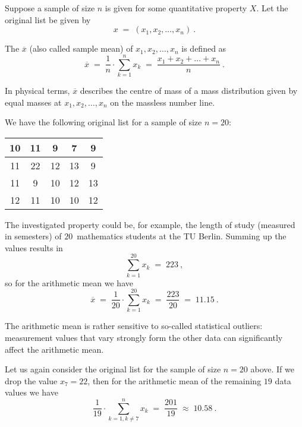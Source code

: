 
\begin{MIntro}

Suppose a sample of size $n$ is given for some quantitative property $X$. Let the original list be given by
$$
x\; =\; (x_{1},x_{2},\ldots ,x_{n})\: .
$$

\begin{MInfo}
The  $\overline{x}$ (also called sample mean) of $x_{1},x_{2},\ldots ,x_{n}$ is defined as
$$
\overline{x}\; =\; \frac{1}{n}\cdot \sum\limits_{k=1} ^{n} x_{k}\;=\;\frac{x_{1}+x_{2}+\ldots +x_{n}}{n}\: .
$$
\end{MInfo}

In physical terms, $\overline{x}$ describes the centre of mass of a mass distribution given by equal masses 
at $x_{1},x_{2},\ldots ,x_{n}$ on the massless number line.


\begin{MExample}
We have the following original list for a sample of size $n=20$:
\begin{center}
\begin{tabular}{|c|c|c|c|c|}
\hline
10 & 11 & 9 & 7 & 9 \\ \hline
11 & 22 & 12 & 13 & 9 \\ \hline
11 & 9 & 10 & 12 & 13 \\ \hline
12 & 11 & 10 & 10 & 12\\ \hline
\end{tabular}
\end{center}

The investigated property could be, for example, the length of study (measured in semesters) of $20$~mathematics 
students at the TU Berlin. Summing up the values results in
$$
\sum\limits_{k=1}^{20}x_{k}\; =\;223\: ,
$$
so for the arithmetic mean we have
$$
\overline{x}\;=\; \frac{1}{20}\cdot \sum\limits_{k=1}^{20}x_{k}\;=\; \frac{223}{20}\; =\; 11.15\: .
$$
\end{MExample}

The arithmetic mean is rather sensitive to so-called statistical outliers: measurement values that 
vary strongly form the other data can significantly affect the arithmetic mean.

\begin{MExample}
Let us again consider the original list for the sample of size $n=20$ above. If we drop the value
$x_{7}=22$, then for the arithmetic mean of the remaining $19$ data values we have
$$
\frac{1}{19}\cdot \sum\limits_{k=1,k\neq 7}^{n}x_{k}\;=\; \frac{201}{19}\; \approx\; 10.58\: .
$$
\end{MExample}


\end{MIntro}
